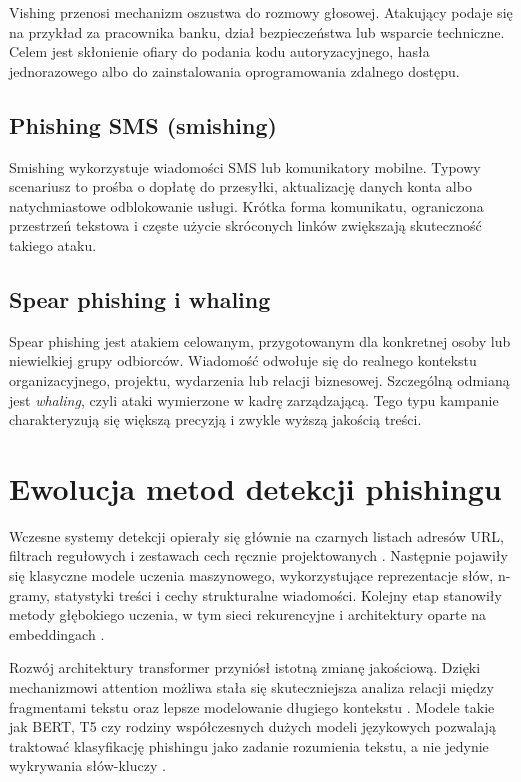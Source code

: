 \documentclass[12pt,a4paper,openright]{report}
\begin{document}
Vishing przenosi mechanizm oszustwa do rozmowy głosowej. Atakujący podaje się na przykład za pracownika banku, dział bezpieczeństwa lub wsparcie techniczne. Celem jest skłonienie ofiary do podania kodu autoryzacyjnego, hasła jednorazowego albo do zainstalowania oprogramowania zdalnego dostępu.

\subsection{Phishing SMS (smishing)}

Smishing wykorzystuje wiadomości SMS lub komunikatory mobilne. Typowy scenariusz to prośba o dopłatę do przesyłki, aktualizację danych konta albo natychmiastowe odblokowanie usługi. Krótka forma komunikatu, ograniczona przestrzeń tekstowa i częste użycie skróconych linków zwiększają skuteczność takiego ataku.

\subsection{Spear phishing i whaling}

Spear phishing jest atakiem celowanym, przygotowanym dla konkretnej osoby lub niewielkiej grupy odbiorców. Wiadomość odwołuje się do realnego kontekstu organizacyjnego, projektu, wydarzenia lub relacji biznesowej. Szczególną odmianą jest \textit{whaling}, czyli ataki wymierzone w kadrę zarządzającą. Tego typu kampanie charakteryzują się większą precyzją i zwykle wyższą jakością treści.

\section{Ewolucja metod detekcji phishingu}

Wczesne systemy detekcji opierały się głównie na czarnych listach adresów URL, filtrach regułowych i zestawach cech ręcznie projektowanych \cite{bergholz2010filtering,fette2007learning}. Następnie pojawiły się klasyczne modele uczenia maszynowego, wykorzystujące reprezentacje słów, n-gramy, statystyki treści i cechy strukturalne wiadomości. Kolejny etap stanowiły metody głębokiego uczenia, w tym sieci rekurencyjne i architektury oparte na embeddingach \cite{hochreiter1997lstm,chollet2017deep}.

Rozwój architektury transformer przyniósł istotną zmianę jakościową. Dzięki mechanizmowi attention możliwa stała się skuteczniejsza analiza relacji między fragmentami tekstu oraz lepsze modelowanie długiego kontekstu \cite{vaswani2017attention}. Modele takie jak BERT, T5 czy rodziny współczesnych dużych modeli językowych pozwalają traktować klasyfikację phishingu jako zadanie rozumienia tekstu, a nie jedynie wykrywania słów-kluczy \cite{devlin2018bert,raffel2019exploring,rahmadani2023robust,wagner2024llms}.
\end{document}
